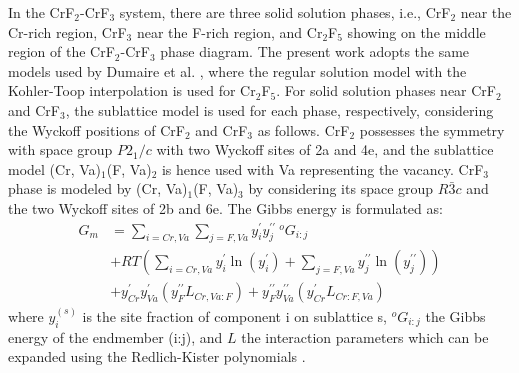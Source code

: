 In the CrF${_2}$-CrF${_3}$ system, there are three solid solution phases, i.e., CrF${_2}$ near the Cr-rich region, CrF${_3}$ near the F-rich region, and Cr$_2$F$_5$ showing on the middle region of the CrF${_2}$-CrF${_3}$ phase diagram. The present work adopts the same models used by Dumaire et al. \cite{dumaire2021thermodynamic}, where the regular solution model with the Kohler-Toop interpolation \cite{kohler1960estimation, toop1965predicting, chartrand2000choice, pelton2001general} is used for Cr$_2$F$_5$. For solid solution phases near CrF${_2}$ and CrF${_3}$, the sublattice model is used for each phase, respectively, considering the Wyckoff positions of CrF${_2}$ and CrF${_3}$ as follows. CrF${_2}$ possesses the symmetry with space group $P2_1/c$ with two Wyckoff sites of 2a and 4e, and the sublattice model (Cr, Va)$_1$(F, Va)$_2$ is hence used with Va representing the vacancy. CrF${_3}$ phase is modeled by (Cr, Va)$_1$(F, Va)$_3$ by considering its space group $R\bar{3}c$ and the two Wyckoff sites of 2b and 6e. The Gibbs energy is formulated as:
\begin{equation} \label{ms:eq:Crssoln}
    \begin{aligned}
        G_m&=\sum_{i=Cr,Va}{\sum_{j=F,Va}{y_i^\prime y_j^{\prime\prime}}\:^oG_{i:j}}\\
        &+RT\left(\sum_{i=Cr,Va}{y_i^\prime\ln{\left(y_i^\prime\right)}}+\sum_{j=F,Va}{y_j^{\prime\prime}\ln{\left(y_j^{\prime\prime}\right)}}\right)\\&+y_{Cr}^\prime y_{Va}^\prime\left(y_F^{\prime\prime}L_{Cr,Va:F}\right)+y_F^{\prime\prime}y_{Va}^{\prime\prime}\left(y_{Cr}^\prime L_{Cr:F,Va}\right)
    \end{aligned}
\end{equation}
where $y_i^{(s)}$ is the site fraction of component i on sublattice s, ${^o}G_{i:j}$ the Gibbs energy of the endmember (i:j), and $L$ the interaction parameters which can be expanded using the Redlich-Kister polynomials \cite{redlich1948algebraic}. 

